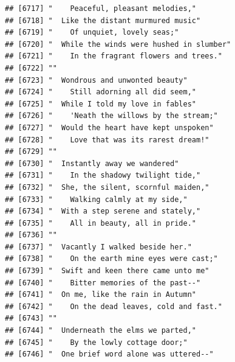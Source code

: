 \documentclass{article}\usepackage[]{graphicx}\usepackage[]{color}
\makeatletter
\newenvironment{kframe}{%
 \def\at@end@of@kframe{}%
 \ifinner\ifhmode%
  \def\at@end@of@kframe{\end{minipage}}%
  \begin{minipage}{\columnwidth}%
 \fi\fi%
 \def\FrameCommand##1{\hskip\@totalleftmargin \hskip-\fboxsep
 \colorbox{shadecolor}{##1}\hskip-\fboxsep
     \hskip-\linewidth \hskip-\@totalleftmargin \hskip\columnwidth}%
 \MakeFramed {\advance\hsize-\width
   \@totalleftmargin\z@ \linewidth\hsize
   \@setminipage}}%
 {\par\unskip\endMakeFramed%
 \at@end@of@kframe}
\newenvironment{knitrout}{}{} %
\makeatother
\begin{document}
\begin{knitrout}
\begin{kframe}
\begin{verbatim}
## [6717] "    Peaceful, pleasant melodies,"                                            
## [6718] "  Like the distant murmured music"                                           
## [6719] "    Of unquiet, lovely seas;"                                                
## [6720] "  While the winds were hushed in slumber"                                    
## [6721] "    In the fragrant flowers and trees."                                      
## [6722] ""                                                                            
## [6723] "  Wondrous and unwonted beauty"                                              
## [6724] "    Still adorning all did seem,"                                            
## [6725] "  While I told my love in fables"                                            
## [6726] "    'Neath the willows by the stream;"                                       
## [6727] "  Would the heart have kept unspoken"                                        
## [6728] "    Love that was its rarest dream!"                                         
## [6729] ""                                                                            
## [6730] "  Instantly away we wandered"                                                
## [6731] "    In the shadowy twilight tide,"                                           
## [6732] "  She, the silent, scornful maiden,"                                         
## [6733] "    Walking calmly at my side,"                                              
## [6734] "  With a step serene and stately,"                                           
## [6735] "    All in beauty, all in pride."                                            
## [6736] ""                                                                            
## [6737] "  Vacantly I walked beside her."                                             
## [6738] "    On the earth mine eyes were cast;"                                       
## [6739] "  Swift and keen there came unto me"                                         
## [6740] "    Bitter memories of the past--"                                           
## [6741] "  On me, like the rain in Autumn"                                            
## [6742] "    On the dead leaves, cold and fast."                                      
## [6743] ""                                                                            
## [6744] "  Underneath the elms we parted,"                                            
## [6745] "    By the lowly cottage door;"                                              
## [6746] "  One brief word alone was uttered--"                                        

\end{verbatim}
\end{kframe}
\end{knitrout}
\end{document}
